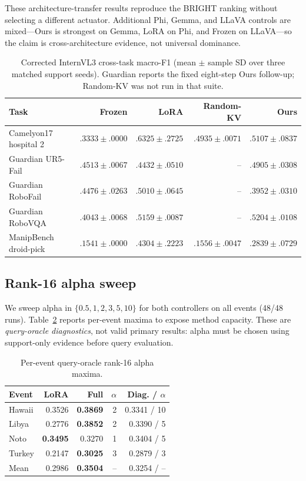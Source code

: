\documentclass[conference]{IEEEtran}
\begin{document}
These architecture-transfer results reproduce the BRIGHT ranking without
selecting a different actuator.  Additional Phi, Gemma, and LLaVA controls are
mixed---Ours is strongest on Gemma, LoRA on Phi, and Frozen on LLaVA---so the
claim is cross-architecture evidence, not universal dominance.

\begin{table}[t]
\centering\small
\caption{Corrected InternVL3 cross-task macro-F1 (mean $\pm$ sample SD over
three matched support seeds). Guardian reports the fixed eight-step Ours
follow-up; Random-KV was not run in that suite.}
\label{tab:crosstask}
\begin{tabular}{lrrrr}
\toprule
Task & Frozen & LoRA & Random-KV & Ours\\
\midrule
Camelyon17 hospital 2 & $.3333\pm.0000$ & $.6325\pm.2725$ & $.4935\pm.0071$ & $.5107\pm.0837$\\
Guardian UR5-Fail & $.4513\pm.0067$ & $.4432\pm.0510$ & -- & $\mathbf{.4905\pm.0308}$\\
Guardian RoboFail & $.4476\pm.0263$ & $\mathbf{.5010\pm.0645}$ & -- & $.3952\pm.0310$\\
Guardian RoboVQA & $.4043\pm.0068$ & $.5159\pm.0087$ & -- & $\mathbf{.5204\pm.0108}$\\
ManipBench droid-pick & $.1541\pm.0000$ & $\mathbf{.4304\pm.2223}$ & $.1556\pm.0047$ & $.2839\pm.0729$\\
\bottomrule
\end{tabular}
\end{table}

\subsection{Rank-16 alpha sweep}
We sweep alpha in $\{0.5,1,2,3,5,10\}$ for both controllers on all events
(48/48 runs). Table~\ref{tab:oracle} reports per-event maxima to expose method
capacity. These are \emph{query-oracle diagnostics}, not valid primary results:
alpha must be chosen using support-only evidence before query evaluation.

\begin{table}[t]
\centering\small
\caption{Per-event query-oracle rank-16 alpha maxima.}
\label{tab:oracle}
\begin{tabular}{lrrrr}
\toprule
Event & LoRA & Full & $\alpha$ & Diag. / $\alpha$\\
\midrule
Hawaii & 0.3526 & \textbf{0.3869} & 2 & 0.3341 / 10\\
Libya & 0.2776 & \textbf{0.3852} & 2 & 0.3390 / 5\\
Noto & \textbf{0.3495} & 0.3270 & 1 & 0.3404 / 5\\
Turkey & 0.2147 & \textbf{0.3025} & 3 & 0.2879 / 3\\
\midrule
Mean & 0.2986 & \textbf{0.3504} & -- & 0.3254 / --\\
\bottomrule
\end{tabular}
\end{table}
\end{document}
